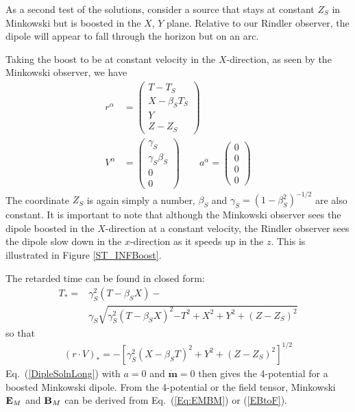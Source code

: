 As a second test of the solutions, consider a source that
stays at constant $Z_S$ in Minkowski but is boosted in 
the $X$, $Y$ plane. Relative to our Rindler observer, 
the dipole will appear to fall through the horizon but on an arc.

Taking the boost to be at constant velocity in the $X$-direction, as seen by the Minkowski observer, we have
\begin{align}
\label{Eq:BoostedFF}
r^{\alpha}  &=
\begin{pmatrix}
T-T_S   \\
X-\beta_S T_S \\
Y  \\
Z -Z_S
\end{pmatrix} \\
V^{\alpha} &=
\begin{pmatrix}
 \gamma_S \\
\gamma_S \beta_S \\
0 \\
0
\end{pmatrix} \qquad
a^{\alpha} =
\begin{pmatrix}
0  \\
0  \\
0  \\
0
\end{pmatrix} \nonumber
\end{align}
The coordinate $Z_S$ is again simply a number, $\beta_S$ and $\gamma_S =
\left( 1 - \beta^2_S\right)^{-1/2}$ are also constant. It is important
to note that although the Minkowski observer sees the dipole boosted
in the $X$-direction at a constant velocity, the Rindler observer sees the
dipole slow down in the $x$-direction as it speeds up in the $z$. This is 
illustrated in Figure \ref{ST_INFBoost}.

The retarded time can be found in closed form:
\begin{align}
T_*=  & \gamma^2_S{(T-\beta_S X)}-    \\
& \gamma_S \sqrt{ \gamma^2_S \left({T-\beta_S X}\right)^2  {-T^2+X^2+Y^2+(Z-Z_S)^2} } \nonumber 
\end{align}
so that 
\begin{align}
\left(r \cdot V\right)_*= - \left[ \gamma^2_S (X-\beta_S T)^2+Y^2+(Z-Z_S)^2 \right]^{1/2}  
\label{rV_InfB}
\end{align}
Eq.\ (\ref{DipleSolnLong}) with $a = 0$ and $\mathbf{\dot{m}} = 0$ then gives the 4-potential for a boosted Minkowski dipole. 
From the 4-potential or the field tensor, Minkowski ${\bf E}_M$ and ${\bf B}_M$
can be derived from Eq.\ (\ref{Eq:EMBM}) or (\ref{EBtoF}).


